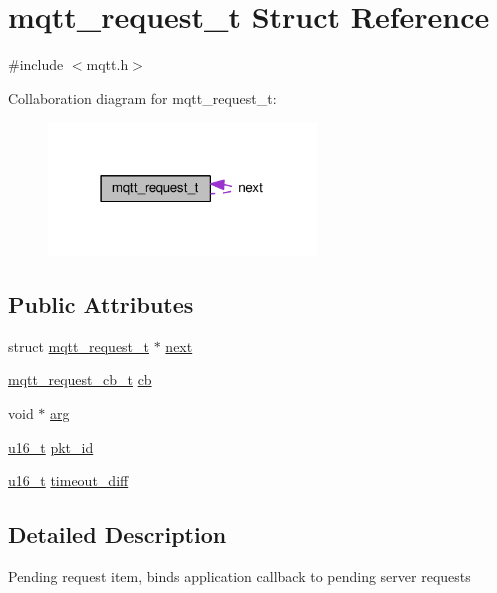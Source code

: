 \hypertarget{structmqtt__request__t}{}\section{mqtt\+\_\+request\+\_\+t Struct Reference}
\label{structmqtt__request__t}


{\ttfamily \#include $<$mqtt.\+h$>$}



Collaboration diagram for mqtt\+\_\+request\+\_\+t\+:
\nopagebreak
\begin{figure}[H]
\begin{center}
\leavevmode
\includegraphics[width=202pt]{structmqtt__request__t__coll__graph}
\end{center}
\end{figure}
\subsection*{Public Attributes}
\begin{DoxyCompactItemize}
\item 
struct \hyperlink{structmqtt__request__t}{mqtt\+\_\+request\+\_\+t} $\ast$ \hyperlink{structmqtt__request__t_af313d3aad3b4be3e61547ff3f1188ea1}{next}
\item 
\hyperlink{group__mqtt_gacad2bbe2cee76eaa120cc63e2f6094fd}{mqtt\+\_\+request\+\_\+cb\+\_\+t} \hyperlink{structmqtt__request__t_a32a4b14b0b8b5b8ce8db1074e53f4a79}{cb}
\item 
void $\ast$ \hyperlink{structmqtt__request__t_a4489023eb18e6cff7829e4bb2e66227f}{arg}
\item 
\hyperlink{group__compiler__abstraction_ga77570ac4fcab86864fa1916e55676da2}{u16\+\_\+t} \hyperlink{structmqtt__request__t_af2dc3cd85cdad25b9b3e1534ecc0cb58}{pkt\+\_\+id}
\item 
\hyperlink{group__compiler__abstraction_ga77570ac4fcab86864fa1916e55676da2}{u16\+\_\+t} \hyperlink{structmqtt__request__t_a65a7292669bc1f2d9df8f30bbcd77073}{timeout\+\_\+diff}
\end{DoxyCompactItemize}


\subsection{Detailed Description}
Pending request item, binds application callback to pending server requests 


